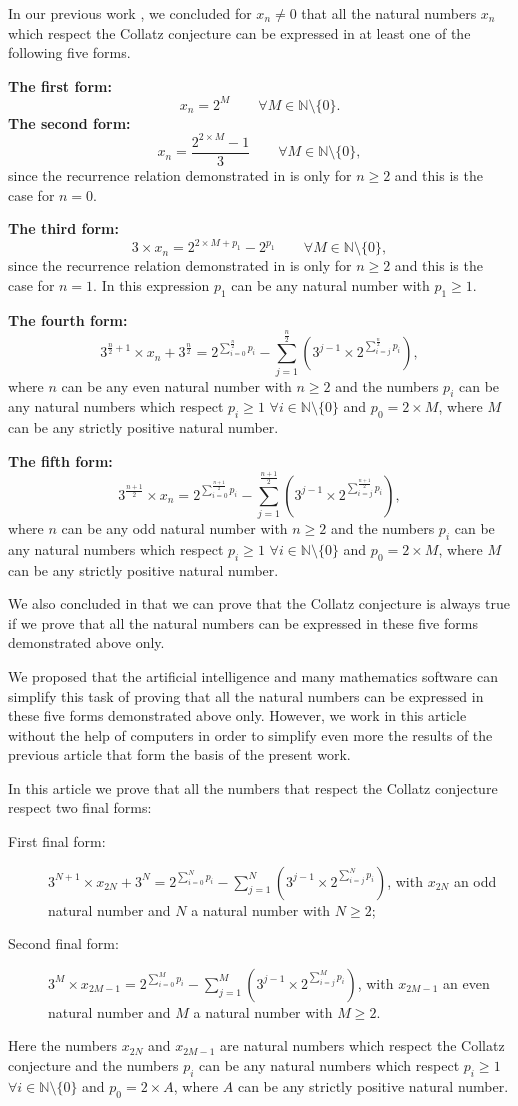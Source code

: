 \documentclass[11pt,a4paper]{article}
\newcommand{\N}{\mathbb{N}}
\newcommand{\Pf}[4]{2^{\sum_{#4=0}^{#1}#3_{#4}}-\sum_{j=1}^{#2}\left(3^{j-1}\times 2^{\sum_{#4=j}^{#1}#3_{#4}}\right)}
\newcommand{\Fone}{3^{N+1}\times x_{2N}+3^{N}=\Pf{N}{N}{p}{i}}
\newcommand{\Ftwo}{3^{M}\times x_{2M-1}=\Pf{M}{M}{p}{i}}
\theoremstyle{definition}
\begin{document}
In our previous work \citep{Louiz2024}, we concluded for $x_n\neq 0$ that all the natural numbers $x_n$
which respect the Collatz conjecture can be expressed in at least one of the following
five forms.

\medskip\noindent\textbf{The first form:}
\[ x_n=2^{M}\qquad \forall M\in\N\setminus\{0\}. \]
\textbf{The second form:}
\[ x_n=\frac{2^{2\times M}-1}{3}\qquad \forall M\in\N\setminus\{0\}, \]
since the recurrence relation demonstrated in \citep{Louiz2024} is only for $n\ge 2$ and
this is the case for $n=0$.

\medskip\noindent\textbf{The third form:}
\[ 3\times x_n=2^{2\times M+p_1}-2^{p_1}\qquad \forall M\in\N\setminus\{0\}, \]
since the recurrence relation demonstrated in \citep{Louiz2024} is only for $n\ge 2$ and
this is the case for $n=1$. In this expression $p_1$ can be any natural number with
$p_1\ge 1$.

\medskip\noindent\textbf{The fourth form:}
\[ 3^{\frac n2+1}\times x_n+3^{\frac n2}=\Pf{\frac n2}{\frac n2}{p}{i}, \]
where $n$ can be any even natural number with $n\ge 2$ and the numbers $p_i$ can be any
natural numbers which respect $p_i\ge 1$ $\forall i\in\N\setminus\{0\}$ and
$p_0=2\times M$, where $M$ can be any strictly positive natural number.

\medskip\noindent\textbf{The fifth form:}
\[ 3^{\frac{n+1}{2}}\times x_n=\Pf{\frac{n+1}{2}}{\frac{n+1}{2}}{p}{i}, \]
where $n$ can be any odd natural number with $n\ge 2$ and the numbers $p_i$ can be any
natural numbers which respect $p_i\ge 1$ $\forall i\in\N\setminus\{0\}$ and
$p_0=2\times M$, where $M$ can be any strictly positive natural number.

\medskip
We also concluded in \citep{Louiz2024} that we can prove that the Collatz conjecture is
always true if we prove that all the natural numbers can be expressed in these five forms
demonstrated above only.

We proposed that the artificial intelligence and many mathematics software can simplify this
task of proving that all the natural numbers can be expressed in these five forms
demonstrated above only. However, we work in this article without the help of computers in
order to simplify even more the results of the previous article \citep{Louiz2024} that form
the basis of the present work.

In this article we prove that all the numbers that respect the Collatz conjecture respect
two final forms:
\begin{description}
\item[First final form:]
$\displaystyle \Fone$, with $x_{2N}$ an odd natural number and $N$ a natural number with
$N\ge 2$;
\item[Second final form:]
$\displaystyle \Ftwo$, with $x_{2M-1}$ an even natural number and $M$ a natural number
with $M\ge 2$.
\end{description}
Here the numbers $x_{2N}$ and $x_{2M-1}$ are natural numbers which respect the Collatz
conjecture and the numbers $p_i$ can be any natural numbers which respect $p_i\ge 1$
$\forall i\in\N\setminus\{0\}$ and $p_0=2\times A$, where $A$ can be any strictly positive
natural number.
\end{document}
